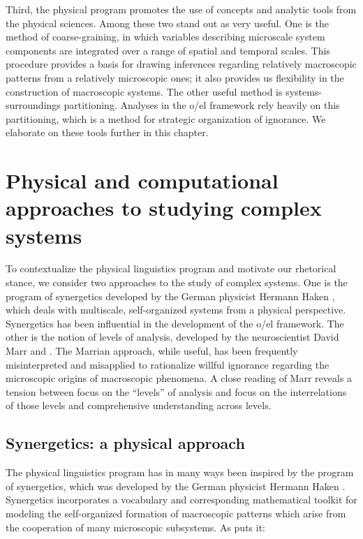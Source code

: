   Third, the physical program promotes the use of concepts and analytic tools from the physical sciences. Among these two stand out as very useful. One is the method of coarse-graining, in which variables describing microscale system components are integrated over a range of spatial and temporal scales. This procedure provides a basis for drawing inferences regarding relatively macroscopic patterns from a relatively microscopic ones; it also provides us flexibility in the construction of macroscopic systems. The other useful method is systems-surroundings partitioning. Analyses in the o/el framework rely heavily on this partitioning, which is a method for strategic organization of ignorance. We elaborate on these tools further in this chapter.

\section{Physical and computational approaches to studying complex systems}

To contextualize the physical linguistics program and motivate our rhetorical stance, we consider two approaches to the study of complex systems. One is the program of synergetics developed by the German physicist Hermann Haken \citep{Haken1973,Haken1983b,Haken1983a}, which deals with multiscale, self-organized systems from a physical perspective. Synergetics has been influential in the development of the o/el framework. The other is the notion of levels of analysis, developed by the neuroscientist David Marr \citep{MarrPoggio1977} and \citep{Marr1982}. The Marrian approach, while useful, has been frequently misinterpreted and misapplied to rationalize willful ignorance regarding the microscopic origins of macroscopic phenomena. A close reading of Marr reveals a tension between focus on the “levels” of analysis and focus on the interrelations of those levels and comprehensive understanding across levels.

\subsection{Synergetics: a physical approach}

The physical linguistics program has in many ways been inspired by the program of synergetics, which was developed by the German physicist Hermann Haken \citep{Haken1973,Haken1983b,Haken1983a}. Synergetics incorporates a vocabulary and corresponding mathematical toolkit for modeling the self-organized formation of macroscopic patterns which arise from the cooperation of many microscopic subsystems. As \citet{Haken1973} puts it:

